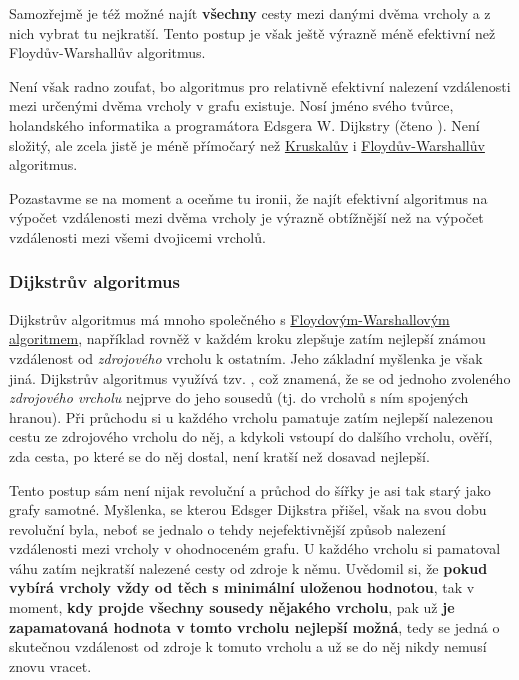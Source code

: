 Samozřejmě je též možné najít \textbf{všechny} cesty mezi danými dvěma vrcholy a
z nich vybrat tu nejkratší. Tento postup je však ještě výrazně méně efektivní
než Floydův-Warshallův algoritmus.

Není však radno zoufat, bo algoritmus pro relativně efektivní nalezení
vzdálenosti mezi určenými dvěma vrcholy v grafu existuje. Nosí jméno svého
tvůrce, holandského informatika a programátora Edsgera W. Dijk\-stry (čteno
). Není složitý, ale zcela jistě je méně přímočarý než
\hyperref[alg:kruskal]{Kruskalův} i
\hyperref[alg:floyd-warshall]{Floydův-Warshallův} algoritmus.

Pozastavme se na moment a oceňme tu ironii, že najít efektivní algoritmus na
výpočet vzdálenosti mezi dvě\-ma vrcholy je výrazně obtížnější než na výpočet
vzdálenosti mezi všemi dvojicemi vrcholů.

\subsubsection{Dijkstrův algoritmus}
\label{sssec:dijkstruv-algoritmus}

Dijkstrův algoritmus má mnoho společného s
\hyperref[alg:floyd-warshall]{Floydovým-Warshallovým algoritmem}, například
rovněž v každém kroku zlepšuje zatím nejlepší známou vzdálenost od
\emph{zdrojového} vrcholu k ostatním. Jeho základní myšlenka je však jiná.
Dijkstrův algoritmus využívá tzv. , což znamená, že se
 od jednoho zvoleného \emph{zdrojového vrcholu} nejprve do jeho sousedů
(tj. do vrcholů s ním spojených hranou). Při průchodu si u každého vrcholu
pamatuje zatím nejlepší nalezenou cestu ze zdrojového vrcholu do něj, a kdykoli
vstoupí do dalšího vrcholu, ověří, zda cesta, po které se do něj dostal, není
kratší než dosavad nejlepší.

Tento postup sám není nijak revoluční a průchod do šířky je asi tak starý jako
grafy samotné. Myšlenka, se kterou Edsger Dijkstra přišel, však na svou dobu
revoluční byla, neboť se jednalo o tehdy nejefektivnější způsob nalezení
vzdálenosti mezi vrcholy v ohodnoceném grafu. U každého vrcholu si pamatoval
váhu zatím nejkratší nalezené cesty od zdroje k němu. Uvědomil si, že
\textbf{pokud vybírá vrcholy vždy od těch s minimální uloženou hodnotou}, tak v
moment, \textbf{kdy projde všechny sousedy nějakého vrcholu}, pak už \textbf{je
zapamatovaná hodnota v tomto vrcholu nejlepší možná}, tedy se jedná o skutečnou
vzdálenost od zdroje k tomuto vrcholu a už se do něj nikdy nemusí znovu vracet.


